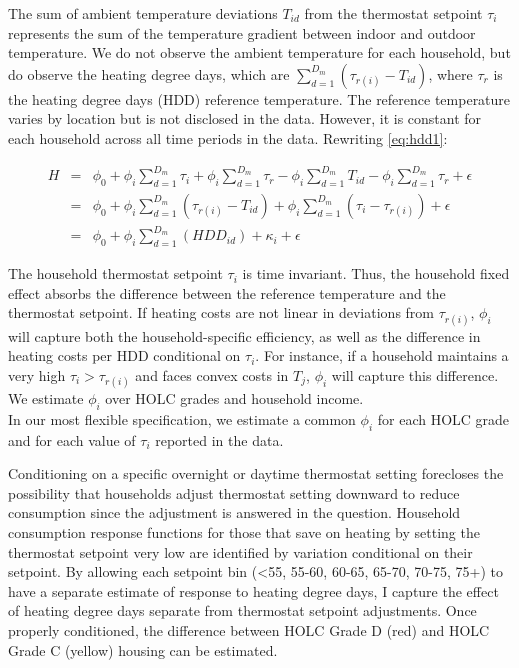\documentclass[
]{article}
\begin{document}
The sum of ambient temperature deviations \(T_{id}\) from the thermostat
setpoint \(\tau_i\) represents the sum of the temperature gradient
between indoor and outdoor temperature. We do not observe the ambient
temperature for each household, but do observe the heating degree days,
which are \(\sum_{d=1}^{D_m}(\tau_{r(i)} - T_{id})\), where \(\tau_r\)
is the heating degree days (HDD) reference temperature. The reference
temperature varies by location but is not disclosed in the data.
However, it is constant for each household across all time periods in
the data. Rewriting \ref{eq:hdd1}:

\begin{eqnarray}
H &=& \phi_0 + \phi_i \sum_{d=1}^{D_m}\tau_i + \phi_i \sum_{d=1}^{D_m} \tau_r - \phi_i \sum_{d=1}^{D_m} T_{id} - \phi_i \sum_{d=1}^{D_m} \tau_r + \epsilon \nonumber \\
 &=& \phi_0 + \phi_i \sum_{d=1}^{D_m}(\tau_{r(i)} - T_{id}) + \phi_i \sum_{d=1}^{D_m}(\tau_i-\tau_{r(i)}) + \epsilon \nonumber \\
 &=& \phi_0 + \phi_i \sum_{d=1}^{D_m}(HDD_{id}) + \kappa_{i} + \epsilon \label{eq:hdd2}
\end{eqnarray}

The household thermostat setpoint \(\tau_i\) is time invariant. Thus,
the household fixed effect absorbs the difference between the reference
temperature and the thermostat setpoint. If heating costs are not linear
in deviations from \(\tau_{r(i)}\), \(\phi_i\) will capture both the
household-specific efficiency, as well as the difference in heating
costs per HDD conditional on \(\tau_i\). For instance, if a household
maintains a very high \(\tau_i>\tau_{r(i)}\) and faces convex costs in
\(T_j\), \(\phi_i\) will capture this difference. We estimate \(\phi_i\)
over HOLC grades and household income.\\
In our most flexible specification, we estimate a common \(\phi_i\) for
each HOLC grade and for each value of \(\tau_i\) reported in the data.

Conditioning on a specific overnight or daytime thermostat setting
forecloses the possibility that households adjust thermostat setting
downward to reduce consumption since the adjustment is answered in the
question. Household consumption response functions for those that save
on heating by setting the thermostat setpoint very low are identified by
variation conditional on their setpoint. By allowing each setpoint bin
(\textless55, 55-60, 60-65, 65-70, 70-75, 75+) to have a separate
estimate of response to heating degree days, I capture the effect of
heating degree days separate from thermostat setpoint adjustments. Once
properly conditioned, the difference between HOLC Grade D (red) and HOLC
Grade C (yellow) housing can be estimated.
\end{document}
